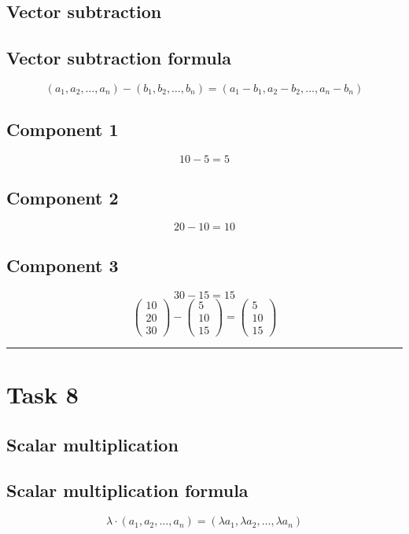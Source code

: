 \documentclass{article}
\begin{document}
\subsection*{Vector subtraction}
\subsection*{ \vspace{1em} Vector subtraction formula}
\[
(a_1, a_2, \dots, a_n) - (b_1, b_2, \dots, b_n) = (a_1 - b_1, a_2 - b_2, \dots, a_n - b_n)
\]
\subsection*{ \vspace{1em} Component 1}
\[
10 - 5 = 5
\]
\subsection*{ \vspace{1em} Component 2}
\[
20 - 10 = 10
\]
\subsection*{ \vspace{1em} Component 3}
\[
30 - 15 = 15
\]
\[
\begin{pmatrix}10 \\ 20 \\ 30\end{pmatrix} - \begin{pmatrix}5 \\ 10 \\ 15\end{pmatrix} = \begin{pmatrix}5 \\ 10 \\ 15\end{pmatrix}
\]
\vspace{1em}
\hrule
\vspace{1em}
\section*{Task 8}

\subsection*{Scalar multiplication}
\subsection*{ \vspace{1em} Scalar multiplication formula}
\[
\lambda \cdot (a_1, a_2, \dots, a_n) = (\lambda a_1, \lambda a_2, \dots, \lambda a_n)
\]
\end{document}
